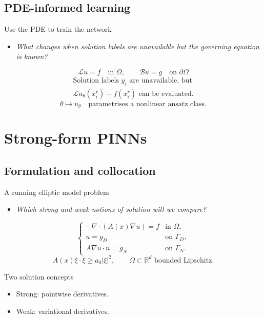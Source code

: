 \documentclass[aspectratio=43,11pt]{beamer}
\newcommand{\slideid}{L3}
\newcommand{\R}{\mathbb{R}}
\newcommand{\Lop}{\mathcal{L}}
\newcommand{\Bop}{\mathcal{B}}
\newenvironment{slideitems}{\small\begin{itemize}\setlength\itemsep{0.45em}}{\end{itemize}}
\newcommand{\guidingquestion}[1]{\begin{slideitems}\item\textit{#1}\end{slideitems}}
\begin{document}
\subsection{PDE-informed learning}
\renewcommand{\slideid}{L3-S008}
\begin{frame}[c]{Use the PDE to train the network}
\small
\guidingquestion{What changes when solution labels are unavailable but the governing equation is known?}
\[
\boxed{
\Lop u=f \quad\text{in }\Omega,
\qquad
\Bop u=g \quad\text{on }\partial\Omega
}
\]
\[
\begin{gathered}
\text{Solution labels }y_i\text{ are unavailable, but}\\
\Lop u_\theta(x_i^r)-f(x_i^r)\text{ can be evaluated.}
\end{gathered}
\]
\[
\theta \longmapsto u_\theta
\quad \text{parametrises a nonlinear ansatz class.}
\]
\begin{center}
\end{center}
\end{frame}

\section{Strong-form PINNs}
\subsection{Formulation and collocation}
\renewcommand{\slideid}{L3-S010}
\begin{frame}[c]{A running elliptic model problem}
\small
\guidingquestion{Which strong and weak notions of solution will we compare?}
\[
\begin{cases}
-\nabla\cdot(A(x)\nabla u)=f & \text{in }\Omega,\\
u=g_D & \text{on }\Gamma_D,\\
A\nabla u\cdot n=g_N & \text{on }\Gamma_N.
\end{cases}
\]
\[
A(x)\xi\cdot\xi\ge a_0|\xi|^2,
\qquad
\Omega\subset\R^d \text{ bounded Lipschitz}.
\]
\begin{block}{Two solution concepts}
\begin{slideitems}
\item Strong: pointwise derivatives.
\item Weak: variational derivatives.
\end{slideitems}
\end{block}
\end{frame}
\end{document}
